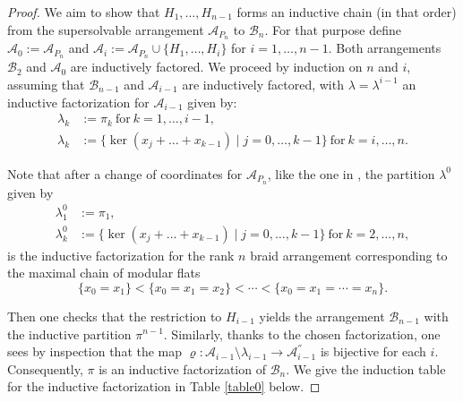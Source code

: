 \documentclass[12pt]{amsart}
\newcommand\CA{{\mathscr A}}
\newcommand\CB{{\mathscr B}}
\numberwithin{equation}{section}
\theoremstyle{plain}
\theoremstyle{definition}
\begin{document}
\begin{proof}
	We aim to show that $H_1,\ldots,H_{n-1}$  forms an inductive chain (in that order) from the supersolvable arrangement $\CA_{P_n}$ to $\CB_n$. For that purpose define $\CA_0:=\CA_{P_n}$ and $\CA_i := \CA_{P_n} \cup \{H_1,\ldots, H_i\}$ for $i = 1, \ldots, n-1$. Both arrangements $\CB_2$ and $\CA_0$ are inductively factored. We proceed by induction on $n$ and $i$, assuming that $\CB_{n-1}$ and $\CA_{i-1}$ are inductively factored, with $\lambda=\lambda^{i-1}$ an inductive factorization for $\CA_{i-1}$ given by:
	\begin{align*}
		\lambda_k & :=  \pi_k \ \text{for}\ k=1, \ldots,i-1, \\
		\lambda_{k} &:= \{\ker(x_j +\ldots+ x_{k-1}) \mid j = 0,\ldots ,k-1 \}\ \text{for}\  k=i, \ldots,n.
	\end{align*}

	Note that after a change of coordinates for $\CA_{P_n}$, like the one in \cite[Ex.~1.2]{cuntzkuehne:subgraphs}, the partition $\lambda^0$ given by
	\begin{align*}
		\lambda_1^0 & :=  \pi_1, \\
		\lambda_{k}^0 &:=  \{\ker(x_j +\ldots+ x_{k-1}) \mid j = 0,\ldots ,k-1 \}\ \text{for}\ k = 2, \ldots, n,
	\end{align*}
	is the inductive factorization for the rank $n$ braid arrangement corresponding to the maximal chain of modular flats $$\{x_0=x_1\}<\{x_0=x_1=x_2\}<\cdots < \{x_0=x_1=\cdots =x_n\}.$$

	Then one checks that the restriction to $H_{i-1}$ yields the arrangement $\CB_{n-1}$ with the inductive partition $\pi^{n-1}$. Similarly, thanks to the chosen factorization, one sees by inspection that the map $\varrho\colon \CA_{i-1} \setminus \lambda_{i-1} \rightarrow \CA_{i-1}^{''}$ is bijective for each $i$.  Consequently,
	$\pi$ is an inductive factorization of $\CB_n$.
	We give the induction table for the inductive factorization in Table \ref{table0} below.
\end{proof}
\end{document}
